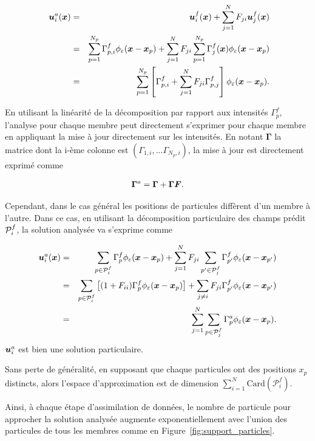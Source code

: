 \begin{eqnarray*}~\label{eq:enkf_formula_same_part}
    \bm{u}_i^a(\bm{x}) &=& \bm{u}_i^f(\bm{x}) + \sum_{j=1}^{N} F_{ji} \bm{u}_j ^f(\bm{x}) \\
    &=& \sum_{p=1}^{N_p} \Gamma^f_{p,i} \phi_{\varepsilon}(\bm{x} - \bm{x}_p) + \sum_{j=1}^{N} F_{ji} \sum_{p=1}^{N_p} \Gamma_j ^f(\bm{x}) \phi_{\varepsilon}(\bm{x} - \bm{x}_p) \\
    &=& \sum_{p=1}^{N_p} \left[\Gamma^f_{p,i} + \sum_{j=1}^{N} F_{ji} \Gamma^f_{p,j} \right] \phi_{\varepsilon}(\bm{x} - \bm{x}_p).
\end{eqnarray*}

En utilisant la linéarité de la décomposition par rapport aux intensités $\Gamma^f_{p}$, l'analyse pour chaque membre peut directement s'exprimer pour chaque membre en appliquant la mise à jour directement sur les intensités. En notant $\bm \Gamma$ la matrice dont la i-ème colonne est $(\Gamma_{1, i},...\Gamma_{N_p, i})$, la mise à jour est directement exprimé comme

\begin{equation*}
    \bm \Gamma^a = \bm \Gamma + \bm \Gamma \bm{F}.
\end{equation*}

Cependant, dans le cas général les positions de particules diffèrent d'un membre à l'autre. Dans ce cas, en utilisant la décomposition particulaire des champs prédit $\mathcal{P}_i^f$, la solution analysée va s'exprime comme

\begin{eqnarray*}
    \bm{u}_i^a(\bm{x}) &=& \sum_{p \in \mathcal{P}_i^f}\Gamma^f_p \phi_{\varepsilon}(\bm{x} - \bm{x}_p) + \sum_{j=1}^{N} F_{ji}  \sum_{p' \in \mathcal{P}_j^f}\Gamma^f_{p'} \phi_{\varepsilon}(\bm{x} - \bm{x}_{p'}) \\
    &=& \sum_{p \in \mathcal{P}_i^f}\left[(1 + F_{ii})\Gamma^f_p \phi_{\varepsilon}(\bm{x} - \bm{x}_{p})\right]   + \sum_{j\neq i} F_{ji} \Gamma^f_{p'} \phi_{\varepsilon}(\bm{x} - \bm{x}_{p'})\\
    &=& \sum_{j=1}^{N} \sum_{p \in \mathcal{P}_j^f} \Gamma^a_p \phi_{\varepsilon}(\bm{x} - \bm{x}_p).
\end{eqnarray*}
$\bm{u}_i^a$ est bien une solution particulaire.


Sans perte de généralité, en supposant que chaque particules ont des positions $x_p$ distincts, alors l'espace d'approximation est de dimension $\sum_{i=1}^{N} \text{Card}(\mathcal{P}^f_i)$.

Ainsi, à chaque étape d'assimilation de données, le nombre de particule pour approcher la solution analysée augmente exponentiellement avec l'union des particules de tous les membres comme en Figure~\ref{fig:support_particles}.

